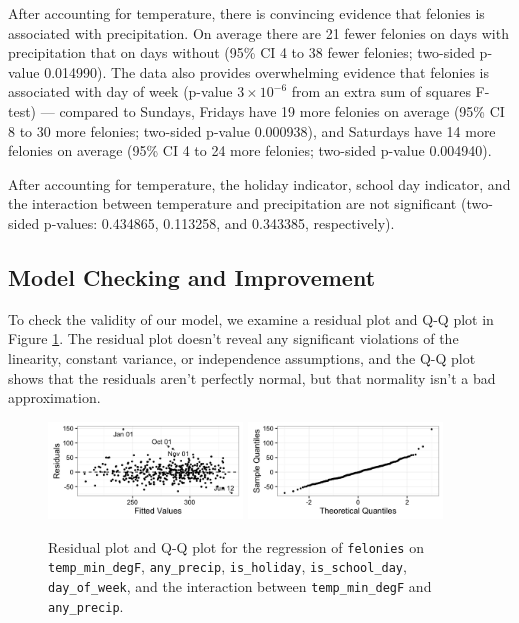 \documentclass[11pt,notitlepage]{article}
\begin{document}





After accounting for temperature, there is convincing evidence that felonies is associated with precipitation. On average there are 21 fewer felonies on days with precipitation that on days without (95\% CI 4 to 38 fewer felonies; two-sided p-value 0.014990). The data also provides overwhelming evidence that felonies is associated with day of week (p-value $3 \times 10^{-6}$ from an extra sum of squares F-test) --- compared to Sundays, Fridays have 19 more felonies on average (95\% CI 8 to 30 more felonies; two-sided p-value 0.000938), and Saturdays have 14 more felonies on average (95\% CI 4 to 24 more felonies; two-sided p-value 0.004940).

After accounting for temperature, the holiday indicator, school day indicator, and the interaction between temperature and precipitation are not significant (two-sided p-values: 0.434865, 0.113258, and 0.343385, respectively).

\subsection{Model Checking and Improvement}
\label{sec:modelFeloniesModelCheckingImprovement}

To check the validity of our model, we examine a residual plot and Q-Q plot in Figure \ref{fig:lm4ResidualsQQ}. The residual plot doesn't reveal any significant violations of the linearity, constant variance, or independence assumptions, and the Q-Q plot shows that the residuals aren't perfectly normal, but that normality isn't a bad approximation.

\begin{figure}[!h]
  \centering
  \captionsetup{width=0.8\textwidth}
  \subfloat%
  		{\includegraphics[width=0.46\textwidth]
  		{figures/lm4Residuals.png}\label{fig:lm4Residuals}}
  \hfill
  \subfloat%
  		{\includegraphics[width=0.46\textwidth]
  		{figures/lm4QQ.png}\label{fig:lm4QQ}}
  \caption{Residual plot and Q-Q plot for the regression of \texttt{felonies} on \texttt{temp_min_degF}, \texttt{any_precip}, \texttt{is_holiday}, \texttt{is_school_day}, \texttt{day_of_week}, and the interaction between \texttt{temp_min_degF} and \texttt{any_precip}.}
  \label{fig:lm4ResidualsQQ}
\end{figure}
\end{document}
